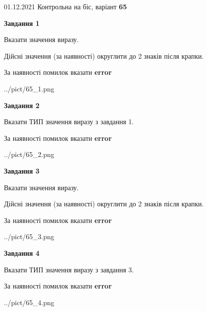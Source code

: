 \documentclass[11pt, ukrainian]{article}
\begin{document}
{01.12.2021 Контрольна на біс, варіант  \No \textbf { 65 }\par}
{
\begin {large}
{\begin {center}\textbf{Завдання 1}\end {center}}\par
Вказати значення виразу. \par
Дійсні значення (за наявності) округлити до 2 знаків після крапки. \par
За наявності помилок вказати \textbf{error}

\begin{center}
	{../pict/65_1.png}
\end{center}
\newpage

{\begin {center}\textbf{Завдання 2}\end {center}}\par
Вказати ТИП значення виразу з завдання 1. \par
За наявності помилок вказати \textbf{error}

\begin{center}
	{../pict/65_2.png}
\end{center}
\newpage

{\begin {center}\textbf{Завдання 3}\end {center}}\par
Вказати значення виразу. \par
Дійсні значення (за наявності) округлити до 2 знаків після крапки. \par
За наявності помилок вказати \textbf{error}

\begin{center}
	{../pict/65_3.png}
\end{center}
\newpage

{\begin {center}\textbf{Завдання 4}\end {center}}\par
Вказати ТИП значення виразу з завдання 3. \par
За наявності помилок вказати \textbf{error}

\begin{center}
	{../pict/65_4.png}
\end{center}
\newpage


\end{large}}
\end{document}
